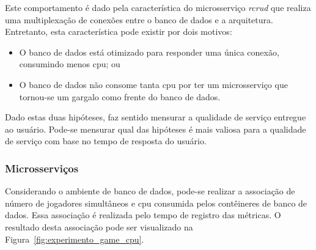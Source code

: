 Este comportamento é dado pela característica do microsserviço \textit{rcrud} que realiza uma multiplexação de conexões entre o banco de dados e a arquitetura.
%
Entretanto, esta característica pode existir por dois motivos:

\begin{itemize}
 \item O banco de dados está otimizado para responder uma única conexão, consumindo menos \ac{cpu}; ou
 \item O banco de dados não consome tanta \ac{cpu} por ter um microsserviço que tornou-se um gargalo como frente do banco de dados.
\end{itemize}

Dado estas duas hipóteses, faz sentido mensurar a qualidade de serviço entregue ao usuário.
%
Pode-se mensurar qual das hipóteses é mais valiosa para a qualidade de serviço com base no tempo de resposta do usuário.


\subsubsection{Microsserviços}

Considerando o ambiente de banco de dados, pode-se realizar a associação de número de jogadores simultâneos e \ac{cpu} consumida pelos contêineres de banco de dados.
%
Essa associação é realizada pelo tempo de registro das métricas.
%
O resultado desta associação pode ser visualizado na Figura~\ref{fig:experimento_game_cpu}.

